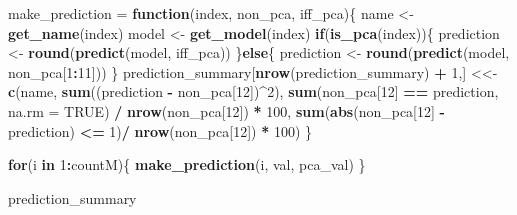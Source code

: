 \documentclass[
]{article}
\newenvironment{Shaded}{\begin{snugshade}}{\end{snugshade}}
\newcommand{\AttributeTok}[1]{\textcolor[rgb]{0.13,0.29,0.53}{#1}}
\newcommand{\ConstantTok}[1]{\textcolor[rgb]{0.56,0.35,0.01}{#1}}
\newcommand{\ControlFlowTok}[1]{\textcolor[rgb]{0.13,0.29,0.53}{\textbf{#1}}}
\newcommand{\DecValTok}[1]{\textcolor[rgb]{0.00,0.00,0.81}{#1}}
\newcommand{\FunctionTok}[1]{\textcolor[rgb]{0.13,0.29,0.53}{\textbf{#1}}}
\newcommand{\NormalTok}[1]{#1}
\newcommand{\OtherTok}[1]{\textcolor[rgb]{0.56,0.35,0.01}{#1}}
\newcommand{\SpecialCharTok}[1]{\textcolor[rgb]{0.81,0.36,0.00}{\textbf{#1}}}
\begin{document}
\begin{Shaded}
\begin{Highlighting}[]
\NormalTok{make\_prediction }\OtherTok{=} \ControlFlowTok{function}\NormalTok{(index, non\_pca, iff\_pca)\{}
\NormalTok{  name  }\OtherTok{\textless{}{-}} \FunctionTok{get\_name}\NormalTok{(index)}
\NormalTok{  model }\OtherTok{\textless{}{-}} \FunctionTok{get\_model}\NormalTok{(index)}
  \ControlFlowTok{if}\NormalTok{(}\FunctionTok{is\_pca}\NormalTok{(index))\{}
\NormalTok{    prediction }\OtherTok{\textless{}{-}} \FunctionTok{round}\NormalTok{(}\FunctionTok{predict}\NormalTok{(model, iff\_pca))}
\NormalTok{  \}}\ControlFlowTok{else}\NormalTok{\{}
\NormalTok{    prediction }\OtherTok{\textless{}{-}} \FunctionTok{round}\NormalTok{(}\FunctionTok{predict}\NormalTok{(model, non\_pca[}\DecValTok{1}\SpecialCharTok{:}\DecValTok{11}\NormalTok{]))}
\NormalTok{  \}}
\NormalTok{  prediction\_summary[}\FunctionTok{nrow}\NormalTok{(prediction\_summary) }\SpecialCharTok{+} \DecValTok{1}\NormalTok{,] }\OtherTok{\textless{}\textless{}{-}} \FunctionTok{c}\NormalTok{(name,}
    \FunctionTok{sum}\NormalTok{((prediction }\SpecialCharTok{{-}}\NormalTok{ non\_pca[}\DecValTok{12}\NormalTok{])}\SpecialCharTok{\^{}}\DecValTok{2}\NormalTok{),}
    \FunctionTok{sum}\NormalTok{(non\_pca[}\DecValTok{12}\NormalTok{] }\SpecialCharTok{==}\NormalTok{ prediction, }\AttributeTok{na.rm =} \ConstantTok{TRUE}\NormalTok{) }\SpecialCharTok{/} \FunctionTok{nrow}\NormalTok{(non\_pca[}\DecValTok{12}\NormalTok{]) }\SpecialCharTok{*} \DecValTok{100}\NormalTok{,}
    \FunctionTok{sum}\NormalTok{(}\FunctionTok{abs}\NormalTok{(non\_pca[}\DecValTok{12}\NormalTok{] }\SpecialCharTok{{-}}\NormalTok{ prediction) }\SpecialCharTok{\textless{}=} \DecValTok{1}\NormalTok{)}\SpecialCharTok{/} \FunctionTok{nrow}\NormalTok{(non\_pca[}\DecValTok{12}\NormalTok{]) }\SpecialCharTok{*} \DecValTok{100}\NormalTok{)}
\NormalTok{\}}
\end{Highlighting}
\end{Shaded}

\begin{Shaded}
\begin{Highlighting}[]
\ControlFlowTok{for}\NormalTok{(i }\ControlFlowTok{in} \DecValTok{1}\SpecialCharTok{:}\NormalTok{countM)\{ }\FunctionTok{make\_prediction}\NormalTok{(i, val, pca\_val) \}}
\end{Highlighting}
\end{Shaded}

\begin{Shaded}
\begin{Highlighting}[]
\NormalTok{prediction\_summary}
\end{Highlighting}
\end{Shaded}
\end{document}
